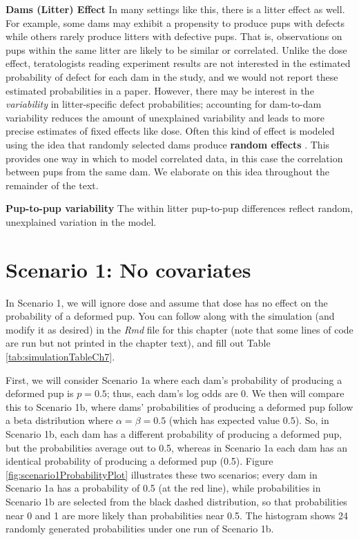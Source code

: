 \documentclass[
]{krantz}
\begin{document}
\textbf{Dams (Litter) Effect} In many settings like this, there is a litter effect as well. For example, some dams may exhibit a propensity to produce pups with defects while others rarely produce litters with defective pups. That is, observations on pups within the same litter are likely to be similar or correlated. Unlike the dose effect, teratologists reading experiment results are not interested in the estimated probability of defect for each dam in the study, and we would not report these estimated probabilities in a paper. However, there may be interest in the \emph{variability} in litter-specific defect probabilities; accounting for dam-to-dam variability reduces the amount of unexplained variability and leads to more precise estimates of fixed effects like dose. Often this kind of effect is modeled using the idea that randomly selected dams produce \textbf{random effects} . This provides one way in which to model correlated data, in this case the correlation between pups from the same dam. We elaborate on this idea throughout the remainder of the text.

\textbf{Pup-to-pup variability} The within litter pup-to-pup differences reflect random, unexplained variation in the model.

\hypertarget{scenario-1-no-covariates}{%
\section{Scenario 1: No covariates}\label{scenario-1-no-covariates}}

In Scenario 1, we will ignore dose and assume that dose has no effect on the probability of a deformed pup. You can follow along with the simulation (and modify it as desired) in the \emph{Rmd} file for this chapter (note that some lines of code are run but not printed in the chapter text), and fill out Table \ref{tab:simulationTableCh7}.

First, we will consider Scenario 1a where each dam's probability of producing a deformed pup is \(p = 0.5\); thus, each dam's log odds are 0. We then will compare this to Scenario 1b, where dams' probabilities of producing a deformed pup follow a beta distribution where \(\alpha = \beta = 0.5\) (which has expected value \(0.5\)). So, in Scenario 1b, each dam has a different probability of producing a deformed pup, but the probabilities average out to 0.5, whereas in Scenario 1a each dam has an identical probability of producing a deformed pup (0.5). Figure \ref{fig:scenario1ProbabilityPlot} illustrates these two scenarios; every dam in Scenario 1a has a probability of 0.5 (at the red line), while probabilities in Scenario 1b are selected from the black dashed distribution, so that probabilities near 0 and 1 are more likely than probabilities near 0.5. The histogram shows 24 randomly generated probabilities under one run of Scenario 1b.
\end{document}
